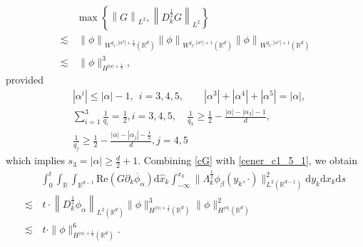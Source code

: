 \documentclass[10pt,twoside,a4paper]{article}
\numberwithin{equation}{section}\allowdisplaybreaks
\def\leq{\leqslant}
\def\geq{\geqslant}
\begin{document}
\begin{align}   \label{cG}
&\max \left\{	\left\|     G \right\|_{L^2}, \left\|  D_k^{\frac 12}   G \right\|_{L^2} \right \}\\
\lesssim &\, \left\|  \phi\right\|_{W^{q_1,|\alpha^3|+\frac32}(\mathbb{R}^d)}  \left\|  \phi\right\|_{W^{q_2,|\alpha^4|+1}(\mathbb{R}^d)}  \left\|  \phi\right\|_{W^{q_3,|\alpha^5|+1}(\mathbb{R}^d)}\nonumber\\
	\lesssim &\,\|\phi\|_{H^{|\alpha|+\frac12}}^3,\nonumber
\end{align}
provided 
\begin{align*}  
&	\left|\alpha^i\right|\leq \left|\alpha\right|-1,~~i=3,4,5, \qquad  \left|\alpha^3\right|+\left|\alpha^4\right|+\left|\alpha^5\right|= \left|\alpha\right|,\\
	&	\sum_{i=1}^3 \frac{1}{q_i}=\frac 12, i=3,4,5,\quad\frac{1}{q_3}\geq \frac 12-\frac{|\alpha|-|\alpha_3|-1}{d},\\
	&\frac{1}{q_j}\geq \frac 12-\frac{|\alpha|-|\alpha_j|-\frac12}{d},j=4,5\nonumber
\end{align*}
which implies  $s_3= |\alpha|\geq \frac{d}{2}+1  $. 
Combining \eqref{cG}  with \eqref{cener_c1_5_1}, we obtain 
\begin{align} \label{cener_c1_5_G}
	& \int_0^t\int_{\mathbb{R}}  \int_{\mathbb{R}^{d-1}}  \mathrm{Re}\left( G \partial_k \overline{\phi}_\alpha \right) \mathrm{d} \hat{x}_k \int_{-\infty}^{x_k} \|\Lambda_k^{\frac 12}\phi_{\beta}(y_k,\cdot)\|^2_{L^2(\mathbb{R}^{d-1})} \mathrm{d} y_k  \mathrm{d} x_k \mathrm{d} s\nonumber\\
	\lesssim &\, t\cdot\left\|   D_k^{\frac 12}\phi_\alpha\right\|_{L^2(\mathbb{R}^d)}\|\phi\|_{H^{|\alpha|+\frac12}(\mathbb{R}^{d})}^3 \|\phi\|^2_{H^{|\alpha|}(\mathbb{R}^{d})}\\
	\lesssim &\,t\cdot\|\phi\|_{H^{|\alpha|+\frac12}(\mathbb{R}^{d})}^6.\nonumber
\end{align}
\end{document}
